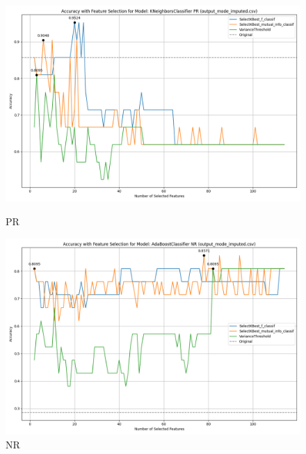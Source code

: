 \begin{figure}[H]
    \centering
    \begin{minipage}[b]{0.45\textwidth}
            \includegraphics[width=\textwidth]{class_all_section/images_class_ensemble_reduction/feature_selection_accuracy_plot_output_mode_imputedcsv_KNeighborsClassifier_PR.png}
        \caption{PR}
        \label{fig_class_all:pr_featred_graph}
    \end{minipage}
    \hfill
    \begin{minipage}[b]{0.45\textwidth}
        \includegraphics[width=\textwidth]{class_all_section/images_class_ensemble_reduction/feature_selection_accuracy_plot_output_mode_imputedcsv_AdaBoostClassifier_NR.png}
        \caption{NR}
        \label{fig_class_all:nr_featred_graph}
    \end{minipage}
\end{figure}


